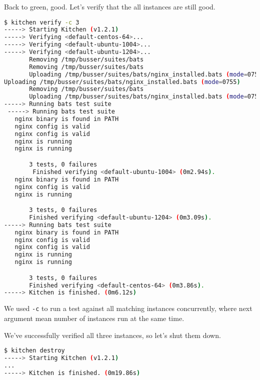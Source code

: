 Back to green, good. Let's verify that the all instances are still good.

\begin{lstlisting}[language=Bash,label=lst:testing-test-kitchen32]
$ kitchen verify -c 3
-----> Starting Kitchen (v1.2.1)
-----> Verifying <default-centos-64>...
-----> Verifying <default-ubuntu-1004>...
-----> Verifying <default-ubuntu-1204>...
       Removing /tmp/busser/suites/bats
       Removing /tmp/busser/suites/bats
       Uploading /tmp/busser/suites/bats/nginx_installed.bats (mode=0755)
Uploading /tmp/busser/suites/bats/nginx_installed.bats (mode=0755)
       Removing /tmp/busser/suites/bats
       Uploading /tmp/busser/suites/bats/nginx_installed.bats (mode=0755)
-----> Running bats test suite
 -----> Running bats test suite                                             1/3
   nginx binary is found in PATH
   nginx config is valid                                                    2/3
   nginx config is valid
   nginx is running                                                         3/3
   nginx is running

       3 tests, 0 failures
        Finished verifying <default-ubuntu-1004> (0m2.94s).                 1/3
   nginx binary is found in PATH
   nginx config is valid
   nginx is running

       3 tests, 0 failures
       Finished verifying <default-ubuntu-1204> (0m3.09s).
-----> Running bats test suite
   nginx binary is found in PATH
   nginx config is valid                                                    2/3
   nginx config is valid
   nginx is running                                                         3/3
   nginx is running

       3 tests, 0 failures
       Finished verifying <default-centos-64> (0m3.86s).
-----> Kitchen is finished. (0m6.12s)
\end{lstlisting}

We used \lstinline!-c! to run a test against all matching instances concurrently, where next argument mean number of instances run at the same time.

We've successfully verified all three instances, so let's shut them down.

\begin{lstlisting}[language=Bash,label=lst:testing-test-kitchen33]
$ kitchen destroy
-----> Starting Kitchen (v1.2.1)
...
-----> Kitchen is finished. (0m19.86s)
\end{lstlisting}

